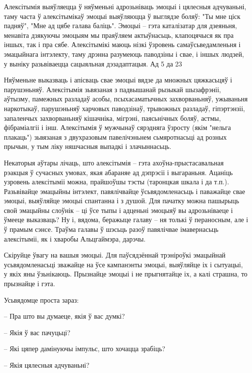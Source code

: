 Алексітымія выяўляецца ў няўменьні адрозьніваць эмоцыі і цялесныя адчуваньні, таму часта ў алексітымікаў эмоцыі выяўляюцца ў выглядзе боляў: "Ты мне ціск падняў", "Мне ад цябе галава баліць". Эмоцыі – гэта каталізатар для дзеяньня, менавіта дзякуючы эмоцыям мы праяўляем актыўнасьць, клапоцячыся як пра іншых, так і пра сябе. Алексітымікі маюць нізкі ўзровень самаўсьведамленьня і эмацыйнага інтэлекту, таму дрэнна разумеюць паводзіны і свае, і іншых людзей, у выніку разьвіваецца сацыяльная дэзадаптацыя. Ад 5 да 23%

Няўменьне выказваць і апісваць свае эмоцыі вядзе да множных цяжкасьцяў і парушэньняў. Алексітымія зьвязаная з падвышанай рызыкай шызафрэніі, аўтызму, памежных разладаў асобы, псыхасаматычных захворваньняў, ужываньня наркотыкаў, парушэньняў харчовых паводзінаў, трывожных разладаў, гіпэртэнзіі, запаленчых захворваньняў кішачніка, мігрэні, паясьнічных боляў, астмы, фібраміалгіі і інш. Алексітымія ў мужчынаў сярэдняга ўзросту (якім "нельга плакаць") зьвязаная з двухразовым павелічэньнем сьмяротнасьці ад розных прычын, у тым ліку няшчасныя выпадкі і злачыннасьць.

Некаторыя аўтары лічаць, што алексітымія – гэта ахоўна-прыстасавальная рэакцыя ў сучасных умовах, якая абараняе ад дэпрэсіі і выгараньня. Ацаніць узровень алексітыміі можна, прайшоўшы тэсты (таронцкая шкала і да т.п.). Разьвівайце эмацыйны інтэлект, павялічвайце ўсьвядомленасьць і паважайце свае эмоцыі, выяўляйце эмоцыі спантанна і з душой. Для пачатку можна пашырыць свой эмацыйны слоўнік – ці ўсе тыпы і адценьні эмоцыяў вы адрозьніваеце і ўмееце выказваць? Ну і, вядома, беражыце галаву – ня толькі ў пераносным, але і ў прамым сэнсе. Траўма галавы ў шэсьць разоў павялічвае імавернасьць алексітыміі, як і хваробы Альцгаймэра, дарэчы.

Скіруйце ўвагу на вашыя эмоцыі. Для паўсядзённай трэніроўкі эмацыйнай усьвядомленасьці зважайце на ўсе кампанэнты эмоцыі, выяўляйце іх і сытуацыі, у якіх яны ўзьнікаюць. Прызнайце эмоцыі і не прыгнятайце іх, а калі страшна, то прызнайце і гэта.

Усьвядомце проста зараз: 

– Пра што вы думаеце, якія ў вас думкі?

– Якія ў вас пачуцьці?

– Які цяпер дамінуючы імпульс, што хочацца зрабіць?

– Якія цялесныя адчуваньні?

